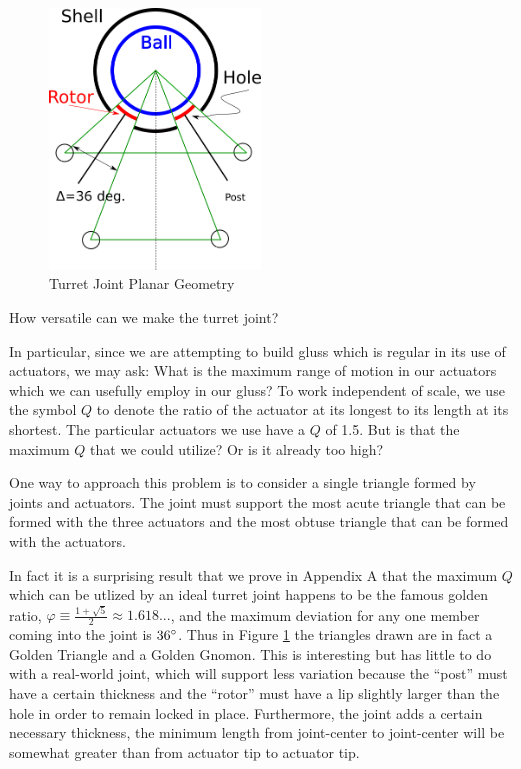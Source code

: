\documentclass[11pt]{article}
\begin{document}
\begin{figure}[!ht]
  \centering
  \includegraphics[width=0.5\textwidth]{SimplifiedConstraintDrawing.png}
    \caption[Turret Joint Planar Geometry]{Turret Joint Planar Geometry}
      \label{simplified-constraint-drawing}
\end{figure}

How versatile can we make the turret joint?

In particular, since we are attempting to build gluss which is regular in its use of actuators, we may ask:
What is the maximum range of motion in our
actuators which we can usefully employ in our gluss?
To work independent of scale, we use the symbol $Q$ to denote the ratio of the actuator at its
longest to its length at its shortest.
The particular actuators we use have a $Q$ of 1.5. But is that the maximum $Q$ that we could utilize? Or is
it already too high?

One way to approach this problem is to consider a single triangle formed by joints and actuators.
The joint must support the most acute triangle
that can be formed with the three actuators and the most obtuse triangle that can be formed with the actuators.

In fact it is a surprising result that we prove in Appendix A that the maximum $Q$ which can be utlized
by an ideal turret joint happens to be
the famous golden ratio, $\varphi \equiv \frac{1 + \sqrt{5}}{2} \approx 1.618...$, and the maximum deviation for any one member coming
into the joint is $36\degree$.
Thus in Figure \ref{simplified-constraint-drawing} the triangles drawn are in fact a Golden Triangle and a Golden Gnomon.
This is interesting but has little to
do with a real-world joint, which will support less variation because the ``post'' must have a
certain thickness and the ``rotor'' must have a lip
slightly larger than the hole in order to remain locked in place.
Furthermore, the joint adds a certain necessary thickness, the minimum length
 from joint-center to joint-center will be somewhat greater than from actuator tip to actuator tip.
\end{document}

